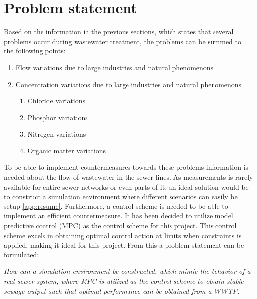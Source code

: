 \newpage
\section{Problem statement}
\label{sec:problem_statement}

Based on the information in the previous sections, which states that several problems occur during wastewater treatment, the problems can be summed to the following points:

\begin{enumerate}
\item Flow variations due to large industries and natural phenomenons
\item Concentration variations due to large industries and natural phenomenons
\begin{enumerate}
	\item Chloride variations
	\item Phosphor variations
	\item Nitrogen variations
	\item Organic matter variations
\end{enumerate}
\end{enumerate}

To be able to implement countermeasures towards these problems information is needed about the flow of wastewater in the sewer lines. As measurements is rarely available for entire sewer networks or even parts of it, an ideal solution would be to construct a simulation environment where different scenarios can easily be setup \ref{app:resume}. Furthermore, a control scheme is needed to be able to implement an efficient countermeasure. It has been decided to utilize model predictive control (MPC) as the control scheme for this project. This control scheme excels in obtaining optimal control action at limits when constraints is applied, making it ideal for this project.
From this a problem statement can be formulated: \\
\begin{center}
\textit{How can a simulation environment be constructed, which mimic the behavior of a real sewer system, where MPC is utilized as the control scheme to obtain stable sewage output such that optimal performance can be obtained from a WWTP.}
\end{center}